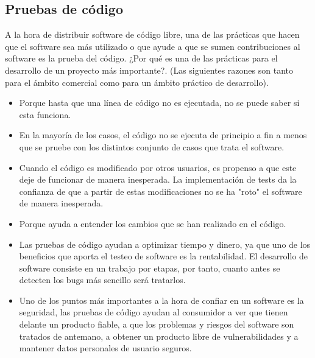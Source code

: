 \subsection*{Pruebas de código}
A la hora de distribuir software de código libre, una de las prácticas que hacen que el software sea más utilizado o que ayude a que se sumen contribuciones al software es la prueba del código. ¿Por qué es una de las prácticas para el desarrollo de un proyecto más importante?. (Las siguientes razones son tanto para el ámbito comercial como para un ámbito práctico de desarrollo). 
\begin{itemize}
    \item Porque hasta que una línea de código no es ejecutada, no se puede saber si esta funciona.
    \item En la mayoría de los casos, el código no se ejecuta de principio a fin a menos que se pruebe con los distintos conjunto de casos que trata el software.
    \item Cuando el código es modificado por otros usuarios, es propenso a que este deje de funcionar de manera inesperada. La implementación de tests da la confianza de que a partir de estas modificaciones no se ha "roto" el software de manera inesperada.
    \item Porque ayuda a entender los cambios que se han realizado en el código.
    \item Las pruebas de código ayudan a optimizar tiempo y dinero, ya que uno de los beneficios que aporta el testeo de software es la rentabilidad. El desarrollo de software consiste en un trabajo por etapas, por tanto, cuanto antes se detecten los bugs más sencillo será tratarlos. 
    \item Uno de los puntos más importantes a la hora de confiar en un software es la seguridad, las pruebas de código ayudan al consumidor a ver que tienen delante un producto fiable, a que los problemas y riesgos del software son tratados de antemano, a obtener un producto libre de vulnerabilidades y a mantener datos personales de usuario seguros.
\end{itemize}

